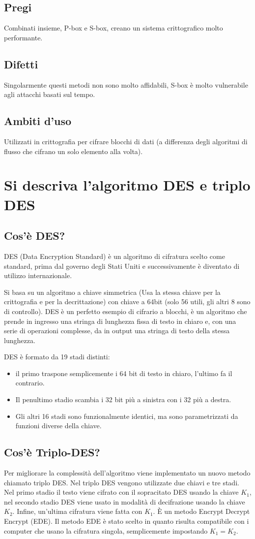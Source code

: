 \subsection{Pregi}
Combinati insieme, P-box e S-box, creano un sistema crittografico molto performante.
\subsection{Difetti}
Singolarmente questi metodi non sono molto affidabili, S-box è molto vulnerabile agli attacchi basati sul tempo.
\subsection{Ambiti d'uso}
Utilizzati in crittografia per cifrare blocchi di dati (a differenza degli algoritmi di flusso che cifrano un solo elemento alla volta).

\section{Si descriva l'algoritmo DES e triplo DES}
\subsection{Cos'è DES?}
DES (Data Encryption Standard) è un algoritmo di cifratura scelto come standard, prima dal governo degli Stati Uniti e successivamente è diventato di utilizzo internazionale.

Si basa su un algoritmo a chiave simmetrica (Usa la stessa chiave per la crittografia e per la decrittazione) con chiave a 64bit (solo 56 utili, gli altri 8 sono di controllo).
DES è un perfetto esempio di cifrario a blocchi, è un algoritmo che prende in ingresso una stringa di lunghezza fissa di testo in chiaro e, con una serie di operazioni complesse, da in output una stringa di testo della stessa lunghezza.

DES è formato da 19 stadi distinti:
\begin{itemize}
\item	il primo traspone semplicemente i 64 bit di testo in chiaro, l'ultimo fa il contrario.
\item	Il penultimo stadio scambia i 32 bit più a sinistra con i 32 più a destra.
\item	Gli altri 16 stadi sono funzionalmente identici, ma sono parametrizzati da funzioni diverse della chiave.
\end{itemize}

\subsection{Cos'è Triplo-DES?}
Per migliorare la complessità dell'algoritmo viene implementato un nuovo metodo chiamato triplo DES. Nel triplo DES vengono utilizzate due chiavi e tre stadi. Nel primo stadio il testo viene cifrato con il sopracitato DES usando la chiave $K_1$, nel secondo stadio DES viene usato in modalità di decifrazione usando la chiave $K_2$. Infine, un'ultima cifratura viene fatta con $K_1$. È un metodo Encrypt Decrypt Encrypt (EDE). Il metodo EDE è stato scelto in quanto risulta compatibile con i computer che usano la cifratura singola, semplicemente impostando $K_1=K_2$.

